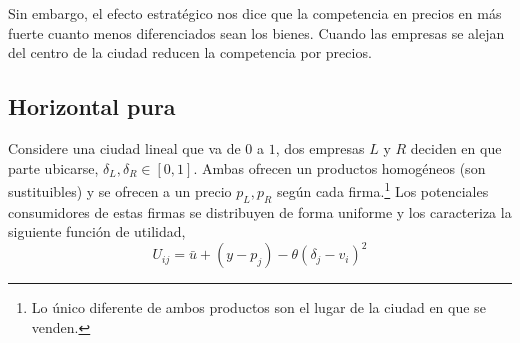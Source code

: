 \documentclass{exam}
\begin{document}
\begin{itemize}
\begin{solution}
        Sin embargo, el efecto estratégico nos dice que la competencia en precios en más fuerte cuanto menos diferenciados sean los bienes. Cuando las empresas se alejan del centro de la ciudad reducen la competencia por precios. 
    \end{solution}
\end{itemize}




\subsection{Horizontal pura}
Considere una ciudad lineal que va de $0$ a $1$, dos empresas $L$ y $R$ deciden en que parte ubicarse, $\delta _L,\delta_R \in [0,1]$. Ambas ofrecen un productos homogéneos (son sustituibles) y se ofrecen a un precio $p_L, p_R$ según cada firma.\footnote{Lo único diferente de ambos productos son el lugar de la ciudad en que se venden.} Los potenciales consumidores de estas firmas se distribuyen de forma uniforme y los caracteriza la siguiente función de utilidad,
\begin{equation*}
    U_{ij} = \bar{u} + (y-p_j) - \theta (\delta_j - v_i)^2 \label{función utilidad}
\end{equation*}
\end{document}
